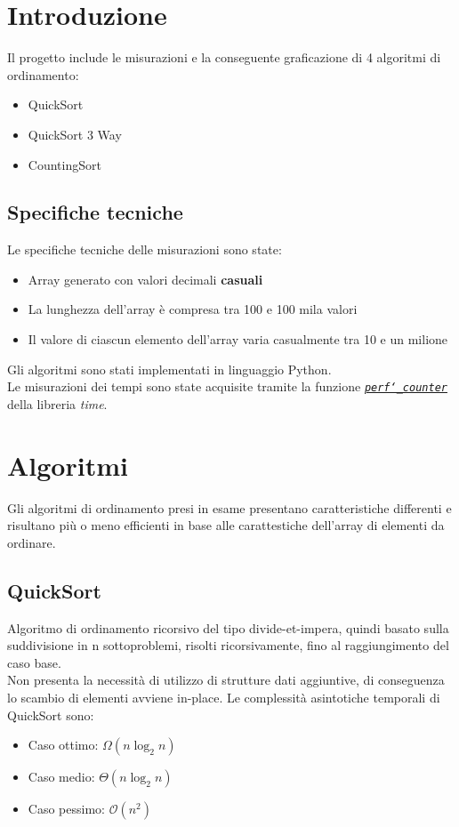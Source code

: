 \documentclass[a4paper, 11pt]{article}
\newcommand{\myfrontpage}{%
  \begin{titlepage}
  \centering
  \preparefrontpage
  \end{titlepage}
}
\begin{document}
\myfrontpage

\thispagestyle{empty} 

\newpage

\tableofcontents
\newpage
\section{Introduzione}
Il progetto include le misurazioni e la conseguente graficazione di 4 algoritmi di ordinamento:
\begin{itemize}
    \item QuickSort
    \item QuickSort 3 Way
    \item CountingSort
\end{itemize}
\subsection{Specifiche tecniche}
Le specifiche tecniche delle misurazioni sono state:
\begin{itemize}
    \item Array generato con valori decimali \textbf{casuali}
    \item La lunghezza dell'array è compresa tra 100 e 100 mila valori
    \item Il valore di ciascun elemento dell'array varia casualmente tra 10 e un milione
\end{itemize}
Gli algoritmi sono stati implementati in linguaggio Python. \\
Le misurazioni dei tempi sono state acquisite tramite la funzione \href{https://docs.python.org/3/library/time.html#time.perf_counter}{\textit{\texttt{perf\char`_counter}}} della libreria \textit{time}.

\section{Algoritmi}
Gli algoritmi di ordinamento presi in esame presentano caratteristiche differenti e risultano più o meno efficienti in base alle carattestiche dell'array di elementi da ordinare.

\subsection{QuickSort}
Algoritmo di ordinamento ricorsivo del tipo divide-et-impera, quindi basato sulla suddivisione in n sottoproblemi, risolti ricorsivamente, fino al raggiungimento del caso base.\\
Non presenta la necessità di utilizzo di strutture dati aggiuntive, di conseguenza lo scambio di elementi avviene in-place.\bigbreak
\noindent Le complessità asintotiche temporali di QuickSort sono:
\begin{itemize}
    \item Caso ottimo: $\Omega(n\log_2n)$
    \item Caso medio: $\Theta(n\log_2n)$
    \item Caso pessimo: $\mathcal{O}(n^2)$
\end{itemize}
\end{document}
